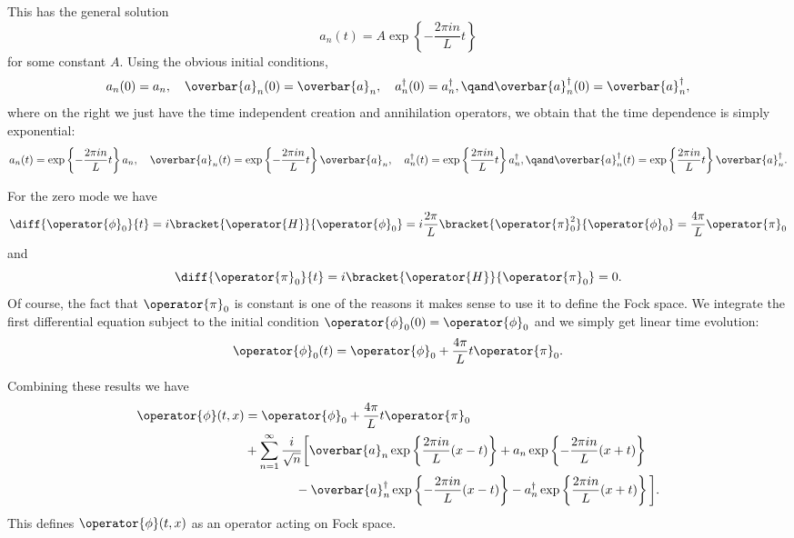 \documentclass[fleqn]{NotesClass}
\newcommand{\hermit}{{\dagger}}
\begin{document}
    This has the general solution
    \begin{equation}
        a_n(t) = A\exp\left\{ -\frac{2\pi in}{L}t \right\}
    \end{equation}
    for some constant \(A\).
    Using the obvious initial conditions,
    \begin{equation}
        a_n(0) = a_n, \quad \overbar{a}_n(0) = \overbar{a}_n, \quad a_n^{\hermit}(0) = a_n^{\hermit}, \qand \overbar{a}_n^{\hermit}(0) = \overbar{a}_n^{\hermit},
    \end{equation}
    where on the right we just have the time independent creation and annihilation operators, we obtain that the time dependence is simply exponential:
    \begin{equation}
        a_n(t) = \exp\left\{ -\frac{2\pi in}{L}t \right\} a_n, \quad \overbar{a}_n(t) = \exp\left\{ -\frac{2\pi in}{L}t \right\} \overbar{a}_n, \quad a_n^{\hermit}(t) = \exp\left\{ \frac{2\pi in}{L}t \right\}a_n^{\hermit}, \qand \overbar{a}_n^{\hermit}(t) = \exp\left\{ \frac{2\pi in}{L}t \right\}\overbar{a}_n^{\hermit}.
    \end{equation}
    
    For the zero mode we have
    \begin{equation}
        \diff{\operator{\phi}_0}{t} = i\bracket{\operator{H}}{\operator{\phi}_0} = i\frac{2\pi}{L}\bracket{\operator{\pi}_0^2}{\operator{\phi}_0} = \frac{4\pi}{L}\operator{\pi}_0
    \end{equation}
    and
    \begin{equation}
        \diff{\operator{\pi}_0}{t} = i\bracket{\operator{H}}{\operator{\pi}_0} = 0.
    \end{equation}
    Of course, the fact that \(\operator{\pi}_0\) is constant is one of the reasons it makes sense to use it to define the Fock space.
    We integrate the first differential equation subject to the initial condition \(\operator{\phi}_0(0) = \operator{\phi}_0\) and we simply get linear time evolution:
    \begin{equation}
        \operator{\phi}_0(t) = \operator{\phi}_0 + \frac{4\pi}{L}t \operator{\pi}_0.
    \end{equation}
    
    Combining these results we have
    \begin{align}
        \operator{\phi}(t, x) &= \operator{\phi}_0 + \frac{4\pi}{L}t \operator{\pi}_0\\
        &+ \sum_{n=1}^{\infty} \frac{i}{\sqrt{n}} \bigg[ \overbar{a}_n \exp\left\{ \frac{2\pi in}{L}(x - t) \right\} + a_n \exp\left\{ -\frac{2\pi in}{L}(x + t) \right\}\notag\\
        &\qquad\qquad- \overbar{a}_n^{\hermit} \exp\left\{ -\frac{2\pi in}{L}(x - t) \right\} - a_n^{\hermit} \exp\left\{ \frac{2\pi in}{L}(x + t) \right\} \bigg]. \notag
    \end{align}
    This defines \(\operator{\phi}(t, x)\) as an operator acting on Fock space.
    
\end{document}
